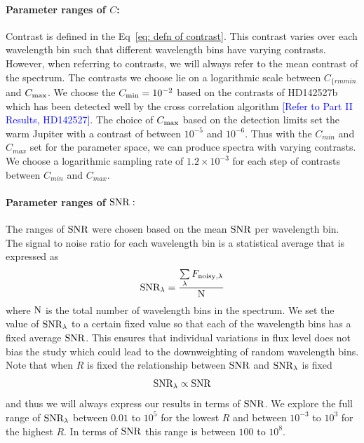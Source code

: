 \paragraph{Parameter ranges of $C$:\\}
Contrast is defined in the Eq~\ref{eq: defn of contrast}.
This contrast varies over each wavelength bin such that different wavelength bins have varying contrasts.
However, when referring to contrasts, we will always refer to the mean contrast of the spectrum.
The contrasts we choose lie on a logarithmic scale between $C_{\{rm{min}}$ and $C_{\rm{max}}$.
We choose the $C_{\rm{min}}=10^{-2}$ based on the contrasts of HD142527b which has been detected well by the cross correlation algorithm \textcolor{blue}{[Refer to Part II Results, HD142527]}.
The choice of $C_{\rm{max}}$ based on the detection limits set the warm Jupiter \citep[\textsc{1000246b}][]{2015Quanz,2023Cugno} with a contrast of between $10^{-5}$ and $10^{-6}$.
Thus with the $C_{min}$ and $C_{max}$ set for the parameter space, we can produce spectra with varying contrasts.
We choose a logarithmic sampling rate of $1.2\times10^{-3}$ for each step of contrasts between $C_{min}$ and $C_{max}$.

\paragraph{Parameter ranges of $\rm{SNR}:\\$}
The ranges of $\rm{SNR}$ were chosen based on the mean $\rm{SNR}$ per wavelength bin.
The signal to noise ratio for each wavelength bin is a statistical average that is expressed as 
\begin{equation}
    \mathrm{SNR_{\lambda}} = \dfrac{\sum\limits_{\lambda} F_{\rm{noisy,\lambda}}}{\rm{N}}
    \end{equation}
where $\rm{N}$ is the total number of wavelength bins in the spectrum.
We set the value of $\rm{SNR_{\lambda}}$ to a certain fixed value so that each of the wavelength bins has a fixed average $\rm{SNR}$.
This ensures that individual variations in flux level does not bias the study which could lead to the downweighting of random wavelength bins.
Note that when $R$ is fixed the relationship between $\rm{SNR}$ and $\rm{SNR_\lambda}$ is fixed
\begin{equation}
    \rm{SNR_{\lambda}} \propto \rm{SNR}
\end{equation}
and thus we will always express our results in terms of $\rm{SNR}$.
We explore the full range of $\rm{SNR_{\lambda}}$ between $0.01$ to $10^{5}$ for the lowest $R$ and between $10^{-3}$ to $10^{3}$ for the highest $R$.
In terms of $\rm{SNR}$ this range is between $100$ to $10^{8}$.

